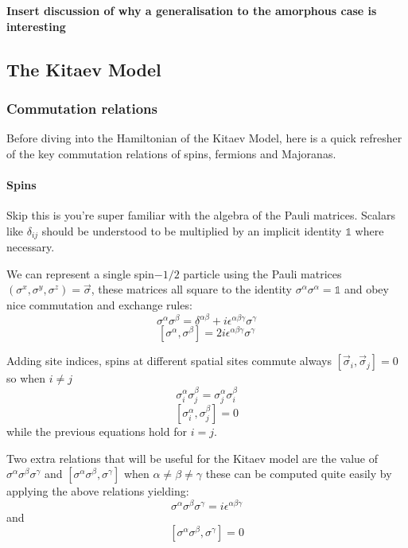 \textbf{Insert discussion of why a generalisation to the amorphous case is interesting}

\hypertarget{the-kitaev-model}{%
\subsection{The Kitaev Model}\label{the-kitaev-model}}

\hypertarget{commutation-relations}{%
\subsubsection{Commutation relations}\label{commutation-relations}}

Before diving into the Hamiltonian of the Kitaev Model, here is a quick refresher of the key commutation relations of spins, fermions and Majoranas.

\hypertarget{spins}{%
\paragraph{Spins}\label{spins}}

Skip this is you're super familiar with the algebra of the Pauli matrices. Scalars like \(\delta_{ij}\) should be understood to be multiplied by an implicit identity \(\mathbb{1}\) where necessary.

We can represent a single spin\(-1/2\) particle using the Pauli matrices \((\sigma^x, \sigma^y, \sigma^z) = \vec{\sigma}\), these matrices all square to the identity \(\sigma^\alpha \sigma^\alpha = \mathbb{1}\) and obey nice commutation and exchange rules: \[\sigma^\alpha \sigma^\beta = \delta^{\alpha \beta} + i \epsilon^{\alpha \beta \gamma} \sigma^\gamma\] \[[\sigma^\alpha, \sigma^\beta] = 2 i \epsilon^{\alpha \beta \gamma} \sigma^\gamma\]

Adding site indices, spins at different spatial sites commute always \([\vec{\sigma}_i, \vec{\sigma}_j] = 0\) so when \(i \neq j\) \[\sigma_i^\alpha \sigma_j^\beta = \sigma_j^\alpha \sigma_i^\beta\] \[[\sigma_i^\alpha, \sigma_j^\beta] = 0\] while the previous equations hold for \(i = j\).

Two extra relations that will be useful for the Kitaev model are the value of \(\sigma^\alpha \sigma^\beta \sigma^\gamma\) and \([\sigma^\alpha \sigma^\beta, \sigma^\gamma]\) when \(\alpha \neq \beta \neq \gamma\) these can be computed quite easily by applying the above relations yielding: \[\sigma^\alpha \sigma^\beta \sigma^\gamma = i \epsilon^{\alpha\beta\gamma}\] and \[[\sigma^\alpha \sigma^\beta, \sigma^\gamma] = 0\]


